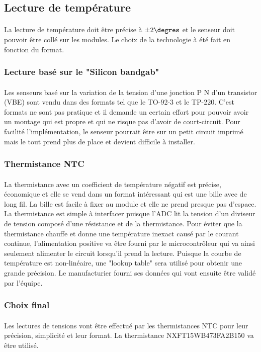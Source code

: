 

\subsection{Lecture de température}
	\paragraph*{}
	La lecture de température doit être précise à $\pm 2\degres$ et le senseur doit pouvoir être collé sur les modules. Le choix de la technologie à été fait en fonction du format. 
	
	\subsubsection*{Lecture basé sur le "Silicon bandgab"}
	\paragraph*{}
	Les senseurs basé sur la variation de la tension d'une jonction P N d'un transistor (VBE) sont vendu dans des formats tel que le TO-92-3 et le TP-220. C'est formats ne sont pas pratique et il demande un certain effort pour pouvoir avoir un montage qui est propre et qui ne risque pas d'avoir de court-circuit. Pour facilité l'implémentation, le senseur pourrait être sur un petit circuit imprimé mais le tout prend plus de place et devient difficile à installer.
	
	\subsubsection*{Thermistance NTC}
	\paragraph*{}
	La thermistance avec un coefficient de température négatif est précise, économique et elle se vend dans un format intéressant qui est une bille avec de long fil. La bille est facile à fixer au module et elle ne prend presque pas d'espace. La thermistance est simple à interfacer puisque l'ADC lit la tension d'un diviseur de tension composé d'une résistance et de la thermistance. Pour éviter que la thermistance chauffe et donne une température inexact causé par le courant continue, l'alimentation positive va être fourni par le microcontrôleur qui va ainsi seulement alimenter le circuit lorsqu'il prend la lecture. Puisque la courbe de température est non-linéaire, une "lookup table" sera utilisé pour obtenir une grande précision. Le manufacturier fourni ses données qui vont ensuite être validé par l'équipe.  
	
	\subsubsection*{Choix final}
	\paragraph*{}
	Les lectures de tensions vont être effectué par les thermistances NTC pour leur précision, simplicité et leur format. La thermistance NXFT15WB473FA2B150 va être utilisé.	